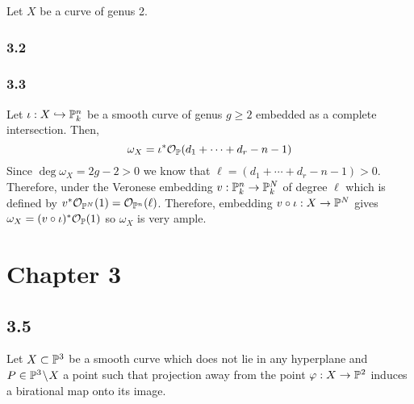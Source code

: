 \documentclass[12pt]{article}
\begin{document}
Let $X$ be a curve of genus 2.

\subsubsection{3.2}

\subsubsection{3.3}

Let $\iota : X \embed \P^n_k$ be a smooth curve of genus $g \ge 2$ embedded as a complete intersection. Then,
\[ \omega_X = \iota^* \struct{\P}(d_1 + \cdots + d_r - n - 1) \]
Since $\deg{\omega_X} = 2 g - 2 > 0$ we know that $\ell = (d_1 + \cdots + d_r - n - 1) > 0$. Therefore, under the Veronese embedding $v : \P^n_k \to \P^N_k$ of degree $\ell$ which is defined by $v^* \struct{\P^{N}}(1) = \struct{\P^n}(\ell)$. Therefore, embedding $v \circ \iota : X \to \P^N$ gives $\omega_X = (v \circ \iota)^* \struct{\P}(1)$ so $\omega_X$ is very ample. 

\section{Chapter 3}

\subsection{3.5}

Let $X \subset \P^3$ be a smooth curve which does not lie in any hyperplane and $P \in \P^3 \sm X$ a point such that projection away from the point $\varphi : X \to \P^2$ induces a birational map onto its image. 
\end{document}
